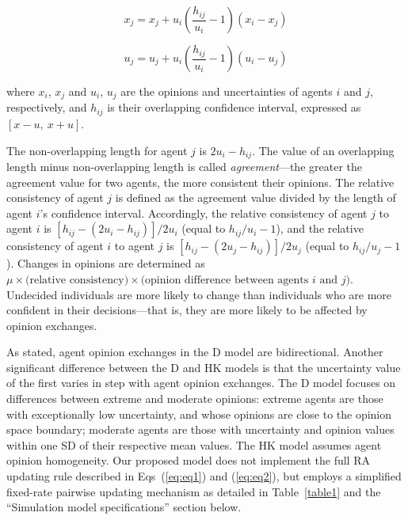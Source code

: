 \documentclass[10pt,letterpaper]{article}
\begin{document}
\begin{equation}
\label{eq:eq1}
x_{j} = x_{j} + u_{i}\left( \frac{h_{ij}}{u_{i}} - 1 \right)\left( x_{i} - x_{j} \right)
\end{equation}

\begin{equation}
\label{eq:eq2}
u_{j} = u_{j} + u_{i}\left( \frac{h_{ij}}{u_{i}} - 1 \right)\left( u_{i} - u_{j} \right)
\end{equation}

\noindent where $x_{i}$, $x_{j}$ and $u_{i}$, $u_{j}$ are the opinions and uncertainties of agents $i$ and $j$, respectively, and $h_{ij}$ is their overlapping confidence interval, expressed as $[x - u,\ x + u]$.

The non-overlapping length for agent $j$ is $2u_{i} - h_{ij}$. The value of an overlapping length minus non-overlapping length is called \textit{agreement}---the greater the agreement value for two agents, the more consistent their opinions. The relative consistency of agent $j$ is defined as the agreement value divided by the length of agent $i$'s confidence interval. Accordingly, the relative consistency of agent $j$ to agent $i$ is $[h_{ij} - (2u_{i} - h_{ij})]/2u_{i}$ (equal to $h_{ij}/u_{i} - 1$), and the relative consistency of agent $i$ to agent $j$ is $[h_{ij} - (2u_{j} - h_{ij})]/2u_{j}$ (equal to $h_{ij}/u_{j} - 1$). Changes in opinions are determined as $\mu \times \text{(relative consistency)} \times \text{(opinion difference between agents } i \text{ and } j\text{)}$. Undecided individuals are more likely to change than individuals who are more confident in their decisions---that is, they are more likely to be affected by opinion exchanges.

As stated, agent opinion exchanges in the D model are bidirectional. Another significant difference between the D and HK models is that the uncertainty value of the first varies in step with agent opinion exchanges. The D model focuses on differences between extreme and moderate opinions: extreme agents are those with exceptionally low uncertainty, and whose opinions are close to the opinion space boundary; moderate agents are those with uncertainty and opinion values within one SD of their respective mean values. The HK model assumes agent opinion homogeneity. Our proposed model does not implement the full RA updating rule described in Eqs~(\ref{eq:eq1}) and (\ref{eq:eq2}), but employs a simplified fixed-rate pairwise updating mechanism as detailed in Table~\ref{table1} and the ``Simulation model specifications'' section below.
\end{document}
